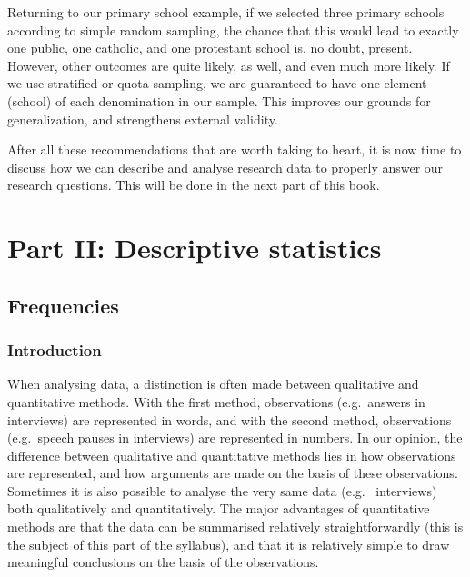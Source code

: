 \documentclass[
]{book}
\begin{document}
Returning to our primary school example, if we selected three primary schools according to simple random sampling, the chance that this would lead to exactly one public, one catholic, and one protestant school is, no doubt, present. However, other outcomes are quite likely, as well, and even much more likely. If we use stratified or quota sampling, we are guaranteed to have one element (school) of each denomination in our sample. This improves our grounds for generalization, and strengthens external validity.

After all these recommendations that are worth taking to heart, it is now time to discuss how we can describe and analyse research data to properly answer our research questions. This will be done in the next part of this book.

\hypertarget{part-part-ii-descriptive-statistics}{%
\part*{Part II: Descriptive statistics}\label{part-part-ii-descriptive-statistics}}

\hypertarget{ch:frequencies}{%
\chapter{Frequencies}\label{ch:frequencies}}

\hypertarget{introduction-3}{%
\section{Introduction}\label{introduction-3}}

When analysing data, a distinction is often made between
qualitative and quantitative methods. With the first method,
observations (e.g.~answers in interviews) are represented in
words, and with the second method, observations (e.g.~speech
pauses in interviews) are represented in numbers. In our opinion,
the difference between qualitative and quantitative methods
lies in how observations are represented, and
how arguments are made on the basis of these observations.
Sometimes it is also possible to analyse the very same data (e.g.~
interviews) both qualitatively and quantitatively. The major
advantages of quantitative methods are that the data can be summarised
relatively straightforwardly (this is the subject of this part of the
syllabus), and that it is relatively simple to draw meaningful conclusions
on the basis of the observations.
\end{document}
